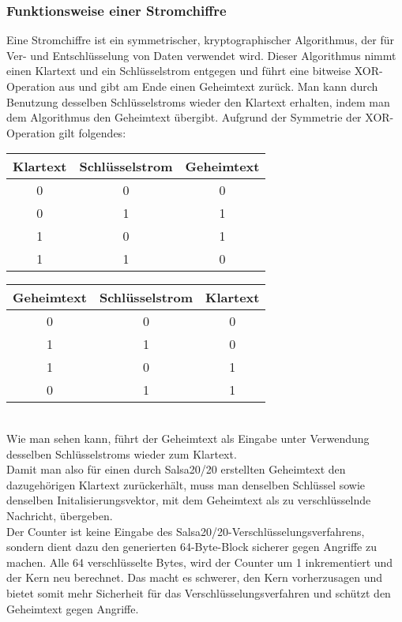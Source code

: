 \documentclass[course=erap]{aspdoc}
\begin{document}
\subsubsection{Funktionsweise einer Stromchiffre} \label{streamcipher}
Eine Stromchiffre ist ein symmetrischer, kryptographischer Algorithmus, der für Ver- und Entschlüsselung von Daten verwendet wird.
Dieser Algorithmus nimmt einen Klartext und ein Schlüsselstrom entgegen und führt eine bitweise XOR-Operation aus und gibt am Ende
einen Geheimtext zurück.
Man kann durch Benutzung desselben Schlüsselstroms wieder den Klartext erhalten, indem man dem Algorithmus den Geheimtext übergibt.
Aufgrund der Symmetrie der XOR-Operation gilt folgendes:
\begin{table}[!h]
    \begin{tabular}{|c|c|c|}
        \hline
        Klartext & Schlüsselstrom & Geheimtext \\
        \hline
        0        & 0              & 0          \\
        0        & 1              & 1          \\
        1        & 0              & 1          \\
        1        & 1              & 0          \\
        \hline
    \end{tabular}
    \begin{tabular}{|c|c|c|}
        \hline
        Geheimtext & Schlüsselstrom & Klartext \\
        \hline
        0          & 0              & 0        \\
        1          & 1              & 0        \\
        1          & 0              & 1        \\
        0          & 1              & 1        \\
        \hline
    \end{tabular}
\end{table}
\\
Wie man sehen kann, führt der Geheimtext als Eingabe unter Verwendung desselben Schlüsselstroms wieder zum Klartext.
\vspace{3mm}
\\
Damit man also für einen durch Salsa20/20 erstellten Geheimtext den dazugehörigen Klartext zurückerhält,
muss man denselben Schlüssel sowie denselben Initalisierungs\-vektor, mit dem Geheimtext als zu verschlüsselnde Nachricht, übergeben.
\\
Der Counter ist keine Eingabe des Salsa20/20-Verschlüsselungsverfahrens, sondern dient dazu den generierten 64-Byte-Block sicherer gegen Angriffe zu machen. 
Alle 64 verschlüsselte Bytes, wird der Counter um 1 inkrementiert und der Kern neu berechnet. Das macht es schwerer, den Kern vorherzusagen und bietet somit mehr Sicherheit für das Verschlüsselungsverfahren und schützt den Geheimtext gegen Angriffe.
\end{document}
